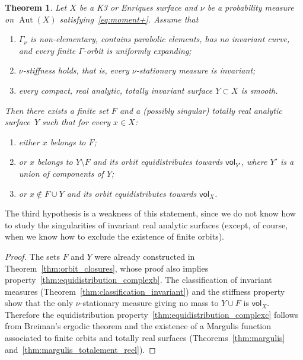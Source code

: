 \documentclass[JEP,XML,SOM,Unicode,published]{cedram}
\newenvironment{enumeratea}
{\bgroup\def\theenumi{\alph{enumi}}\begin{enumerate}}
{\end{enumerate}\egroup}
\DeclareMathOperator{\aut}{Aut}
\newcommand{\vol}{{\mathsf{vol}}}
\theoremstyle{plain}
\newtheorem{thm}{Theorem}[section]
\theoremstyle{definition}
\begin{document}
\begin{thm}\label{thm:equidistribution_complex}
Let $X$ be a K3 or Enriques surface and $\nu$ be a probability
measure on $\aut(X)$ satisfying~\eqref{eq:moment+}.
Assume that
\begin{enumerate}
\item\label{thm:equidistribution_complex1} $\Gamma_\nu$ is non-elementary, contains parabolic elements, has no invariant curve,
and every finite $\Gamma$-orbit is uniformly expanding;
\item $\nu$-stiffness holds, that is, every $\nu$-stationary measure is invariant;
\item\label{thm:equidistribution_complex2} every compact, real analytic, totally invariant surface $Y\subset X$ is smooth.
\end{enumerate}
Then there exists a finite set $F$ and a (possibly singular) totally real analytic surface~$Y$ such that for every
$x\in X$:
\begin{enumeratea}
\item\label{thm:equidistribution_complexa} either $x$ belongs to $F$;
\item\label{thm:equidistribution_complexb} or $x$ belongs to $Y\setminus F$ and its orbit equidistributes towards $\vol_{Y'}$, where $Y'$ is a union of components of $Y$;
\item\label{thm:equidistribution_complexc} or $x\notin F\cup Y$ and its orbit equidistributes towards $\vol_{X}$.
\end{enumeratea}
\end{thm}

The third hypothesis is a weakness of this statement, since we do not know how to study the singularities of invariant real analytic surfaces (except, of course, when we know how to exclude the existence of finite orbits).

\begin{proof}
The sets $F$ and $Y$ were already constructed in Theorem~\ref{thm:orbit_closures}, whose proof
also implies property~\eqref{thm:equidistribution_complexb}.
The classification of invariant measures (Theorem~\ref{thm:classification_invariant}) and the
stiffness property show that the only $\nu$-stationary measure giving no mass to
$Y\cup F$ is $\vol_X$. Therefore the equidistribution property~\eqref{thm:equidistribution_complexc} follows from Breiman's ergodic theorem
and the existence of a Margulis function associated to finite orbits and totally real surfaces (Theorems~\ref{thm:margulis} and~\ref{thm:margulis_totalement_reel}).
\end{proof}
\end{document}
